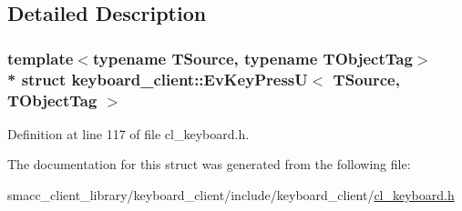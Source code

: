 \subsection{Detailed Description}
\subsubsection*{template$<$typename T\+Source, typename T\+Object\+Tag$>$\\*
struct keyboard\+\_\+client\+::\+Ev\+Key\+Press\+U$<$ T\+Source, T\+Object\+Tag $>$}



Definition at line 117 of file cl\+\_\+keyboard.\+h.



The documentation for this struct was generated from the following file\+:\begin{DoxyCompactItemize}
\item 
smacc\+\_\+client\+\_\+library/keyboard\+\_\+client/include/keyboard\+\_\+client/\hyperlink{cl__keyboard_8h}{cl\+\_\+keyboard.\+h}\end{DoxyCompactItemize}
